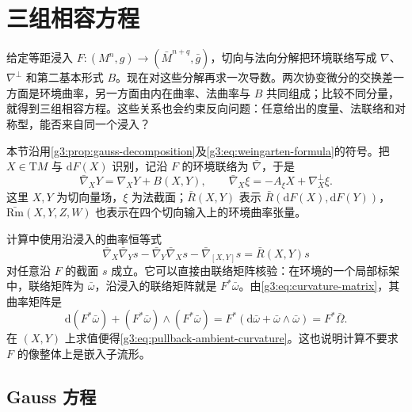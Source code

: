 
% 
% 

\section{三组相容方程}
\label{g3:sec:0402}

给定等距浸入 \(F\colon(M^n,g)\to(\bar M^{n+q},\bar g)\)，切向与法向分解把环境联络写成 \(\nabla\)、\(\nabla^\perp\) 和第二基本形式 \(B\)。现在对这些分解再求一次导数。两次协变微分的交换差一方面是环境曲率，另一方面由内在曲率、法曲率与 \(B\) 共同组成；比较不同分量，就得到三组相容方程。这些关系也会约束反向问题：任意给出的度量、法联络和对称型，能否来自同一个浸入？

\ProseParagraphBreak

本节沿用\cref{g3:prop:gauss-decomposition}及\eqref{g3:eq:weingarten-formula}的符号。把 \(X\in\mathrm{T}M\) 与 \(\mathrm dF(X)\) 识别，记沿 \(F\) 的环境联络为 \(\bar\nabla\)，于是
\begin{equation}\label{g3:eq:submanifold-connection-splitting}
	\bar\nabla_XY=\nabla_XY+B(X,Y),\qquad
	\bar\nabla_X\xi=-A_\xi X+\nabla_X^\perp\xi.
\end{equation}
这里 \(X,Y\) 为切向量场，\(\xi\) 为法截面；\(\bar R(X,Y)\) 表示 \(\bar R(\mathrm dF(X),\mathrm dF(Y))\)，\(\bar{\mathrm{Rm}}(X,Y,Z,W)\) 也表示在四个切向输入上的环境曲率张量。

\ProseParagraphBreak

计算中使用沿浸入的曲率恒等式
\begin{equation}\label{g3:eq:pullback-ambient-curvature}
	\bar\nabla_X\bar\nabla_Ys-\bar\nabla_Y\bar\nabla_Xs-\bar\nabla_{[X,Y]}s
	=\bar R(X,Y)s
\end{equation}
对任意沿 \(F\) 的截面 \(s\) 成立。它可以直接由联络矩阵核验：在环境的一个局部标架中，联络矩阵为 \(\bar\omega\)，沿浸入的联络矩阵就是 \(F^*\bar\omega\)。由\eqref{g3:eq:curvature-matrix}，其曲率矩阵是
\[
	\mathrm d(F^*\bar\omega)+(F^*\bar\omega)\wedge(F^*\bar\omega)
	=F^*(\mathrm d\bar\omega+\bar\omega\wedge\bar\omega)
	=F^*\bar\Omega.
\]
在 \((X,Y)\) 上求值便得\eqref{g3:eq:pullback-ambient-curvature}。这也说明计算不要求 \(F\) 的像整体上是嵌入子流形。

\subsection{Gauss 方程}
\label{g3:subsec:0402:01}

